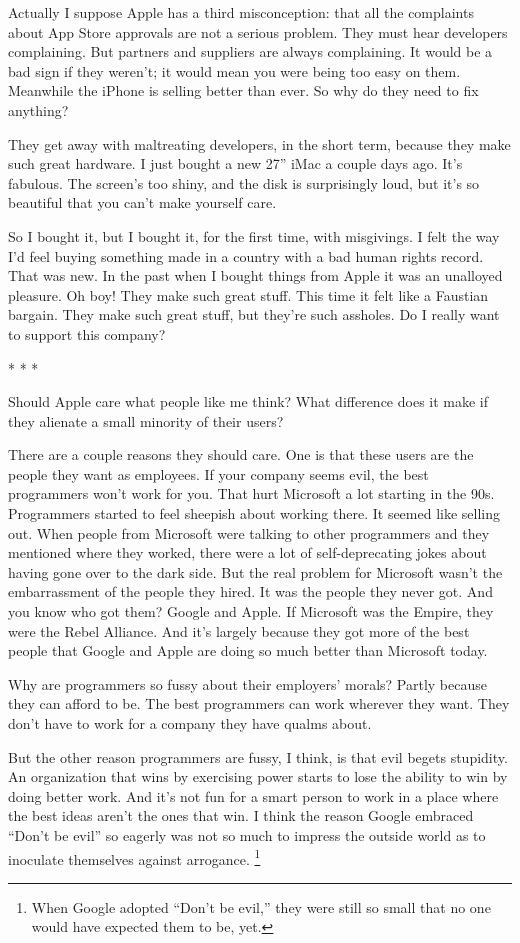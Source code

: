 \documentclass[12pt]{book}
\begin{document}
Actually I suppose Apple has a third misconception: that all the
complaints about App Store approvals are not a serious problem. They
must hear developers complaining. But partners and suppliers are always
complaining. It would be a bad sign if they weren't; it would mean you
were being too easy on them. Meanwhile the iPhone is selling better than
ever. So why do they need to fix anything?

They get away with maltreating developers, in the short term, because
they make such great hardware. I just bought a new 27'' iMac a couple
days ago. It's fabulous. The screen's too shiny, and the disk is
surprisingly loud, but it's so beautiful that you can't make yourself
care.

So I bought it, but I bought it, for the first time, with misgivings. I
felt the way I'd feel buying something made in a country with a bad
human rights record. That was new. In the past when I bought things from
Apple it was an unalloyed pleasure. Oh boy! They make such great stuff.
This time it felt like a Faustian bargain. They make such great stuff,
but they're such assholes. Do I really want to support this company?

* * *

Should Apple care what people like me think? What difference does it
make if they alienate a small minority of their users?

There are a couple reasons they should care. One is that these users are
the people they want as employees. If your company seems evil, the best
programmers won't work for you. That hurt Microsoft a lot starting in
the 90s. Programmers started to feel sheepish about working there. It
seemed like selling out. When people from Microsoft were talking to
other programmers and they mentioned where they worked, there were a lot
of self-deprecating jokes about having gone over to the dark side. But
the real problem for Microsoft wasn't the embarrassment of the people
they hired. It was the people they never got. And you know who got them?
Google and Apple. If Microsoft was the Empire, they were the Rebel
Alliance. And it's largely because they got more of the best people that
Google and Apple are doing so much better than Microsoft today.

Why are programmers so fussy about their employers' morals? Partly
because they can afford to be. The best programmers can work wherever
they want. They don't have to work for a company they have qualms about.

But the other reason programmers are fussy, I think, is that evil begets
stupidity. An organization that wins by exercising power starts to lose
the ability to win by doing better work. And it's not fun for a smart
person to work in a place where the best ideas aren't the ones that win.
I think the reason Google embraced ``Don't be evil'' so eagerly was not
so much to impress the outside world as to inoculate themselves against
arrogance. \footnote{When Google adopted ``Don't be evil,'' they were still so small
that no one would have expected them to be, yet.}
\end{document}
